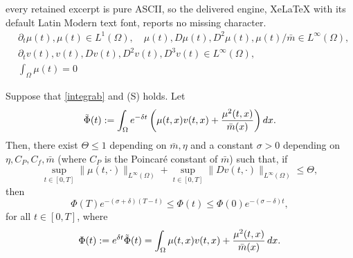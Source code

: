 \documentclass[10pt,a4paper]{amsart}
\newcommand{\Sp}{{\textsc (S)} }
\newcommand{\di}{{\rm d}}
\begin{document}
every retained excerpt is pure ASCII, so the delivered engine, XeLaTeX with its default Latin Modern text font, reports no missing character.
	\begin{equation}\label{integrab}
	\begin{aligned}
	& \partial_t \mu(t), \mu(t) \in L^1(\Omega), \quad  \mu(t), D \mu(t), D^2 \mu(t), \mu(t) / \bar m \in L^\infty(\Omega), \\
	& \partial_t v(t), v(t), Dv(t), D^2 v(t), D^3 v(t) \in L^\infty(\Omega), \\
	& \int_\Omega \mu(t) = 0
	\end{aligned}
	\end{equation}

	\begin{prop} \label{phinl1}
		Suppose that \eqref{integrab} and \Sp holds. Let  
		$$\tilde{\Phi}(t):=\int_{\Omega}e^{-\delta t} \left( \mu(t,x) v(t,x) + \frac{\mu^2(t,x)}{\bar{m}(x)} \right) \di x.$$
		Then, there exist $\Theta \le 1$ depending on $\bar{m}, \eta$ and a constant $\sigma > 0$ depending on $\eta,C_P,C_f,\bar{m}$ (where $C_P$ is the Poincar\'e constant of $\bar{m}$) such that, if
		$$\sup_{t \in [0,T]}\|\mu(t,\cdot)\|_{L^\infty(\Omega)} + \sup_{t \in [0,T]} \| Dv(t,\cdot) \|_{L^\infty(\Omega)} \le \Theta,$$
		then
		\begin{equation}
			\Phi(T) e^{-(\sigma+\delta)(T-t)} \le \Phi(t) \le \Phi(0)e^{-(\sigma-\delta) t},
			\label{phidelta}
		\end{equation}
		for all $t \in [0,T]$, where
		\begin{equation*}
			\Phi(t):=e^{\delta t} \tilde{\Phi}(t) = \int_{\Omega} \mu(t,x) v(t,x) + \frac{\mu^2(t,x)}{\bar{m}(x)} \, \di x.
		\end{equation*}
	\end{prop}
\end{document}
